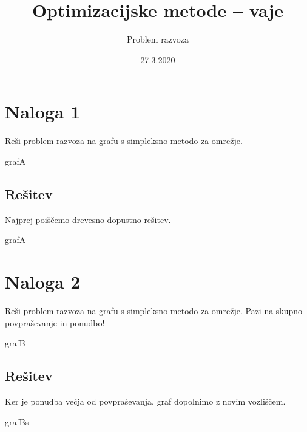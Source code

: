 \documentclass[14pt]{extarticle}
\title{Optimizacijske metode -- vaje}
\author{Problem razvoza}
\date{27.3.2020}
\begin{document}
\maketitle

\section*{Naloga 1}

Reši problem razvoza na grafu s simpleksno metodo za omrežje.

\begin{razvoz}{grafA}
\end{razvoz}

\subsection*{Rešitev}

Najprej poiščemo drevesno dopustno rešitev.

\begin{razvoz}{grafA}


\end{razvoz}

\clearpage
\section*{Naloga 2}

Reši problem razvoza na grafu s simpleksno metodo za omrežje.
Pazi na skupno povpraševanje in ponudbo!

\begin{razvoz}{grafB}
\end{razvoz}

\subsection*{Rešitev}

Ker je ponudba večja od povpraševanja,
graf dopolnimo z novim vozliščem.

\begin{razvoz}{grafBs}
\end{razvoz}
\end{document}
